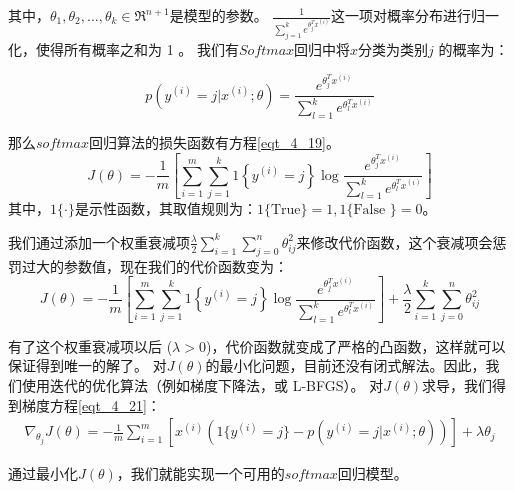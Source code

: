 其中，$\theta_1, \theta_2, \ldots, \theta_k \in \Re^{n+1}$是模型的参数。
$\frac{1}{ \sum_{j=1}^{k}{e^{ \theta_j^T x^{(i)} }} }$这一项对概率分布进行归一化，使得所有概率之和为 1 。
我们有$Softmax$回归中将$x$分类为类别$j$ 的概率为：\par
\begin{equation}
p(y^{(i)} = j | x^{(i)} ; \theta) = \frac{e^{\theta_j^T x^{(i)}}}{\sum_{l=1}^k e^{ \theta_l^T x^{(i)}} }
\end{equation}

那么$softmax$回归算法的损失函数有方程\ref{eqt_4_19}。
\begin{equation}
	\label{eqt_4_19}
	J(\theta) = - \frac{1}{m} \left[ \sum_{i=1}^{m} \sum_{j=1}^{k}  1\left\{y^{(i)} = j\right\} \log \frac{e^{\theta_j^T x^{(i)}}}{\sum_{l=1}^k e^{ \theta_l^T x^{(i)} }}\right]
\end{equation}
其中，$1\{\cdot\}$是示性函数，其取值规则为：$1\{ \text{True} \}=1, 1\{ \text{False }\}=0$。\par

我们通过添加一个权重衰减项$\frac{\lambda}{2} \sum_{i=1}^k \sum_{j=0}^{n} \theta_{ij}^2$来修改代价函数，这个衰减项会惩罚过大的参数值，现在我们的代价函数变为：
\begin{equation}
	\label{eqt_4_20}
	J(\theta) = - \frac{1}{m} \left[ \sum_{i=1}^{m} \sum_{j=1}^{k} 1\left\{y^{(i)} 
	= j\right\} \log \frac{e^{\theta_j^T x^{(i)}}}{\sum_{l=1}^k e^{ \theta_l^T x^{(i)} }}  \right]
	+ \frac{\lambda}{2} \sum_{i=1}^k \sum_{j=0}^n \theta_{ij}^2
\end{equation}

有了这个权重衰减项以后 ($\lambda > 0$)，代价函数就变成了严格的凸函数，这样就可以保证得到唯一的解了。
对$J(\theta)$的最小化问题，目前还没有闭式解法。因此，我们使用迭代的优化算法（例如梯度下降法，或 L-BFGS）。
对$J(\theta)$求导，我们得到梯度方程\ref{eqt_4_21}：
\begin{align}
	\label{eqt_4_21}
	\nabla_{\theta_j} J(\theta) = - \frac{1}{m} \sum_{i=1}^{m}{ \left[ x^{(i)} ( 1\{ y^{(i)} = j\}  - p(y^{(i)} = j | x^{(i)}; \theta) ) \right]  } + \lambda \theta_j
\end{align}

通过最小化$J(\theta)$，我们就能实现一个可用的$softmax$回归模型。\par

